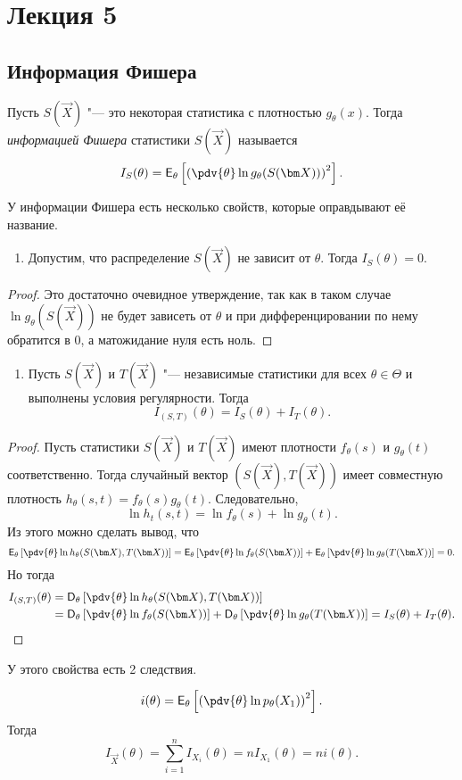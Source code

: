\section{Лекция 5}

\subsection{Информация Фишера}
\begin{definition}
	Пусть $S(\vec{X})$ "--- это некоторая статистика с плотностью $g_{\theta}(x)$. Тогда \emph{информацией Фишера} статистики $S(\vec{X})$ называется
	\[
		I_{S}(\theta) = \EE_{\theta}\left[\left(\pdv{\theta} \ln g_{\theta}(S(\vec{X}))\right)^{2}\right].
	\]
\end{definition}
У информации Фишера есть несколько свойств, которые оправдывают её название.
\begin{enumerate}
	\item Допустим, что распределение $S(\vec{X})$ не зависит от $\theta$. Тогда $I_{S}(\theta) = 0$.
\end{enumerate}
\begin{proof}
	Это достаточно очевидное утверждение, так как в таком случае $\ln g_{\theta}(S(\vec{X}))$ не будет зависеть от $\theta$ и при дифференцировании по нему обратится в 0, а матожидание нуля есть ноль.
\end{proof}
\begin{enumerate}[resume]
	\item Пусть $S(\vec{X})$ и $T(\vec{X})$ "--- независимые статистики для всех $\theta \in \Theta$ и выполнены условия регулярности. Тогда
	\[
		I_{(S, T)}(\theta) = I_{S}(\theta) + I_{T}(\theta).
	\]
\end{enumerate}
\begin{proof}
	Пусть статистики $S(\vec{X})$ и $T(\vec{X})$ имеют плотности $f_{\theta}(s)$ и $g_{\theta}(t)$ соответственно. Тогда случайный вектор $(S(\vec{X}), T(\vec{X}))$ имеет совместную плотность $h_{\theta}(s, t) = f_{\theta}(s)g_{\theta}(t)$. Следовательно,
	\[
		\ln h_{t}(s, t) = \ln f_{\theta}(s) + \ln g_{\theta}(t).
	\]
	Из этого можно сделать вывод, что
	\[
		\EE_{\theta}\left[\pdv{\theta} \ln h_{\theta}(S(\vec{X}), T(\vec{X}))\right] 
		= \EE_{\theta}\left[\pdv{\theta} \ln f_{\theta}(S(\vec{X}))\right] + \EE_{\theta}\left[\pdv{\theta} \ln g_{\theta}(T(\vec{X}))\right]
		= 0.
	\] 
	Но тогда
	\begin{align*}
		I_{(S, T)}(\theta) 
		&= \DD_{\theta}\left[\pdv{\theta} \ln h_{\theta}(S(\vec{X}), T(\vec{X}))\right] \\
		&= \DD_{\theta}\left[\pdv{\theta} \ln f_{\theta}(S(\vec{X}))\right] + \DD_{\theta}\left[\pdv{\theta} \ln g_{\theta}(T(\vec{X}))\right]
		= I_{S}(\theta) + I_{T}(\theta). \qedhere
	\end{align*}
\end{proof}
У этого свойства есть 2 следствия. 
\begin{consequence}
\[
	i(\theta) = \EE_{\theta}\left[\left(\pdv{\theta} \ln p_{\theta}(X_{1})\right)^{2}\right].
\]
Тогда
\[
	I_{\vec{X}}(\theta) = \sum_{i = 1}^{n} I_{X_{i}}(\theta) = nI_{X_{1}}(\theta) = ni(\theta).
\]
\end{consequence}

